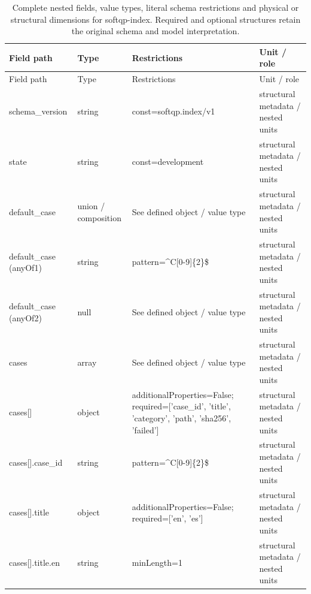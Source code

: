 \begingroup\footnotesize\setlength{\tabcolsep}{3pt}
\begin{longtable}{@{}>{\raggedright\arraybackslash}p{}>{\raggedright\arraybackslash}p{}>{\raggedright\arraybackslash}p{}>{\raggedright\arraybackslash}p{}@{}}
\caption{Complete nested fields, value types, literal schema restrictions and physical or structural dimensions for softqp-index. Required and optional structures retain the original schema and model interpretation.}\label{tab:nested-softqp-index}\\
\toprule Field path & Type & Restrictions & Unit / role\\\midrule\endfirsthead
\toprule Field path & Type & Restrictions & Unit / role\\\midrule\endhead
\bottomrule\endfoot
schema\_\allowbreak{}version & string & const=\allowbreak{}softqp.\allowbreak{}index/\allowbreak{}v1 & structural metadata /\allowbreak{} nested units\\
state & string & const=\allowbreak{}development & structural metadata /\allowbreak{} nested units\\
default\_\allowbreak{}case & union /\allowbreak{} composition & See defined object /\allowbreak{} value type & structural metadata /\allowbreak{} nested units\\
default\_\allowbreak{}case (anyOf1) & string & pattern=\allowbreak{}\textasciicircum{}C[0-9]\{2\}\$ & structural metadata /\allowbreak{} nested units\\
default\_\allowbreak{}case (anyOf2) & null & See defined object /\allowbreak{} value type & structural metadata /\allowbreak{} nested units\\
cases & array & See defined object /\allowbreak{} value type & structural metadata /\allowbreak{} nested units\\
cases[] & object & additionalProperties=\allowbreak{}False; required=\allowbreak{}['case\_\allowbreak{}id', 'title', 'category', 'path', 'sha256', 'failed'] & structural metadata /\allowbreak{} nested units\\
cases[].\allowbreak{}case\_\allowbreak{}id & string & pattern=\allowbreak{}\textasciicircum{}C[0-9]\{2\}\$ & structural metadata /\allowbreak{} nested units\\
cases[].\allowbreak{}title & object & additionalProperties=\allowbreak{}False; required=\allowbreak{}['en', 'es'] & structural metadata /\allowbreak{} nested units\\
cases[].\allowbreak{}title.\allowbreak{}en & string & minLength=\allowbreak{}1 & structural metadata /\allowbreak{} nested units\\

\end{longtable}

